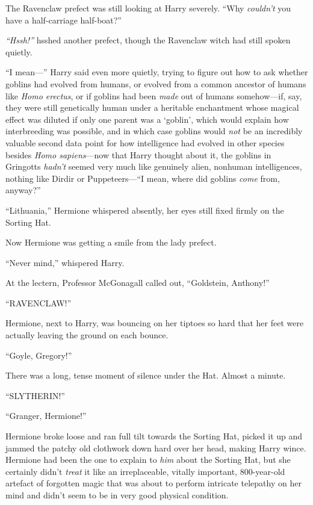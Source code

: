 The Ravenclaw prefect was still looking at Harry severely. ``Why
\emph{couldn't} you have a half-carriage half-boat?''

\emph{``Hssh!''} hsshed another prefect, though the Ravenclaw witch had
still spoken quietly.

``I mean---'' Harry said even more quietly, trying to figure out how to
ask whether goblins had evolved from humans, or evolved from a common
ancestor of humans like \emph{Homo erectus}, or if goblins had been
\emph{made} out of humans somehow---if, say, they were still genetically
human under a heritable enchantment whose magical effect was diluted if
only one parent was a `goblin', which would explain how interbreeding
was possible, and in which case goblins would \emph{not} be an
incredibly valuable second data point for how intelligence had evolved
in other species besides \emph{Homo sapiens}---now that Harry thought
about it, the goblins in Gringotts \emph{hadn't} seemed very much like
genuinely alien, nonhuman intelligences, nothing like Dirdir or
Puppeteers---``I mean, where did goblins \emph{come} from, anyway?''

``Lithuania,'' Hermione whispered absently, her eyes still fixed firmly
on the Sorting Hat.

Now Hermione was getting a smile from the lady prefect.

``Never mind,'' whispered Harry.

At the lectern, Professor McGonagall called out, ``Goldstein, Anthony!''

``RAVENCLAW!''

Hermione, next to Harry, was bouncing on her tiptoes so hard that her
feet were actually leaving the ground on each bounce.

``Goyle, Gregory!''

There was a long, tense moment of silence under the Hat. Almost a
minute.

``SLYTHERIN!''

``Granger, Hermione!''

Hermione broke loose and ran full tilt towards the Sorting Hat, picked
it up and jammed the patchy old clothwork down hard over her head,
making Harry wince. Hermione had been the one to explain to \emph{him}
about the Sorting Hat, but she certainly didn't \emph{treat} it like an
irreplaceable, vitally important, 800-year-old artefact of forgotten
magic that was about to perform intricate telepathy on her mind and
didn't seem to be in very good physical condition.


